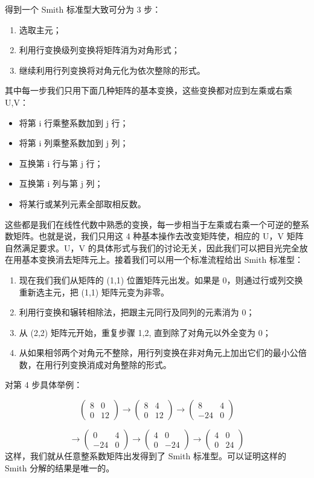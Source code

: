\documentclass[UTF8]{ctexart}
\begin{document}
得到一个 Smith 标准型大致可分为 3 步：
\begin{enumerate}
\item 选取主元；
\item 利用行变换级列变换将矩阵消为对角形式；
\item 继续利用行列变换将对角元化为依次整除的形式。
\end{enumerate}
其中每一步我们只用下面几种矩阵的基本变换，这些变换都对应到左乘或右乘 U,V：
\begin{itemize}
\item 将第 i 行乘整系数加到 j 行；
\item 将第 i 列乘整系数加到 j 列；
\item 互换第 i 行与第 j 行；
\item 互换第 i 列与第 j 列；
\item 将某行或某列元素全部取相反数。
\end{itemize}
这些都是我们在线性代数中熟悉的变换，每一步相当于左乘或右乘一个可逆的整系数矩阵。也就是说，我们只用这 4 种基本操作去改变矩阵使，相应的
U，V 矩阵自然满足要求。U，V 的具体形式与我们的讨论无关，因此我们可以把目光完全放在用基本变换消去矩阵元上。接着我们可以用一个标准流程给出
Smith 标准型：
\begin{enumerate}
\item 现在我们我们从矩阵的 (1,1) 位置矩阵元出发。如果是 0，则通过行或列交换重新选主元，把 (1,1) 矩阵元变为非零。
\item 利用行变换和辗转相除法，把跟主元同行及同列的元素消为 0；
\item 从 (2,2) 矩阵元开始，重复步骤 1,2, 直到除了对角元以外全变为 0；
\item 从如果相邻两个对角元不整除，用行列变换在非对角元上加出它们的最小公倍数，在用行列变换消成对角整除的形式。
\end{enumerate}
对第 4 步具体举例：

\[
\left(\begin{array}{cc}
8 & 0\\
0 & 12
\end{array}\right)\rightarrow\left(\begin{array}{cc}
8 & 4\\
0 & 12
\end{array}\right)\rightarrow\left(\begin{array}{cc}
8 & 4\\
-24 & 0
\end{array}\right)
\]

\[
\rightarrow\left(\begin{array}{cc}
0 & 4\\
-24 & 0
\end{array}\right)\rightarrow\left(\begin{array}{cc}
4 & 0\\
0 & -24
\end{array}\right)\rightarrow\left(\begin{array}{cc}
4 & 0\\
0 & 24
\end{array}\right)
\]
这样，我们就从任意整系数矩阵出发得到了 Smith 标准型。可以证明这样的 Smith 分解的结果是唯一的。
\end{document}
